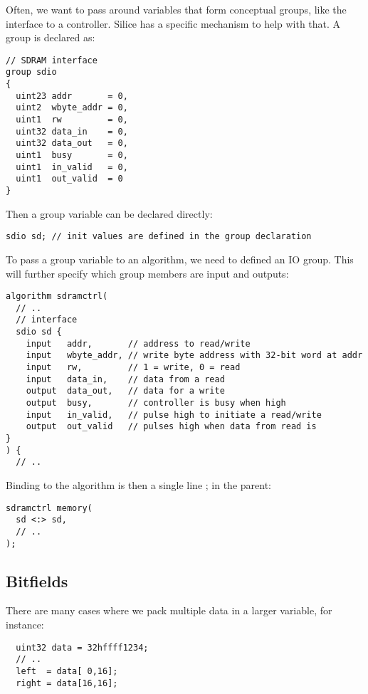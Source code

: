 \documentclass[a4]{article}
\newcommand\silice{Silice}
\begin{document}
Often, we want to pass around variables that form conceptual groups, like the interface to a controller. \silice{} has a specific mechanism to help with that. A group is declared as:

\begin{verbatim}
// SDRAM interface
group sdio
{
  uint23 addr       = 0,
  uint2  wbyte_addr = 0,
  uint1  rw         = 0,
  uint32 data_in    = 0,
  uint32 data_out   = 0,
  uint1  busy       = 0,
  uint1  in_valid   = 0,
  uint1  out_valid  = 0
}
\end{verbatim}


Then a group variable can be declared directly:
\begin{verbatim}
sdio sd; // init values are defined in the group declaration
\end{verbatim}

To pass a group variable to an algorithm, we need to defined an IO group. This will further specify which group members are input and outputs:

\begin{verbatim}
algorithm sdramctrl(
  // ..
  // interface
  sdio sd {
    input   addr,       // address to read/write
    input   wbyte_addr, // write byte address with 32-bit word at addr
    input   rw,         // 1 = write, 0 = read
    input   data_in,    // data from a read
    output  data_out,   // data for a write
    output  busy,       // controller is busy when high
    input   in_valid,   // pulse high to initiate a read/write
    output  out_valid   // pulses high when data from read is
}    
) {
  // ..
\end{verbatim}

Binding to the algorithm is then a single line ; in the parent:

\begin{verbatim}
sdramctrl memory(
  sd <:> sd,
  // ..
);
\end{verbatim}

\subsection{Bitfields}
\label{sec:bitfields}

There are many cases where we pack multiple data in a larger variable, for instance:

\begin{verbatim}
  uint32 data = 32hffff1234;
  // ..
  left  = data[ 0,16];
  right = data[16,16];
\end{verbatim}
\end{document}

